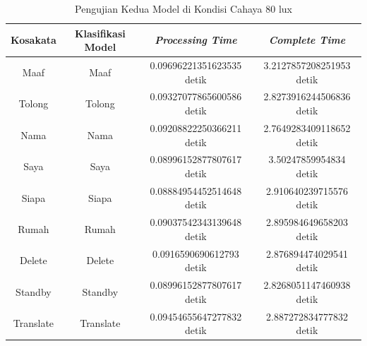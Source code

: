 \newpage
\begin{longtable}{|c|c|c|c|}
  \caption{Pengujian Kedua Model di Kondisi Cahaya 80 lux}
  \label{tb:prediksiremang2}                                   \\
  \hline
  \rowcolor[HTML]{C0C0C0}
  \textbf{Kosakata} & \textbf{Klasifikasi Model} & \textbf{\emph{Processing Time}} & \textbf{\emph{Complete Time}}\\
  \hline
  Maaf              & Maaf                        & 0.09696221351623535 detik                           & 3.2127857208251953 detik                                 \\
  Tolong            & Tolong                      & 0.09327077865600586 detik                           & 2.8273916244506836 detik                                 \\
  Nama              & Nama                        & 0.09208822250366211 detik                           & 2.7649283409118652 detik                                 \\
  Saya              & Saya                        & 0.08996152877807617 detik                           & 3.50247859954834 detik                               \\
  Siapa             & Siapa                       & 0.08884954452514648 detik                           & 2.910640239715576 detik                                \\
  Rumah             & Rumah                       & 0.09037542343139648 detik                           & 2.895984649658203 detik                                \\
  Delete            & Delete                      & 0.0916590690612793 detik                            & 2.876894474029541 detik                                \\
  Standby           & Standby                     & 0.08996152877807617 detik                           & 2.8268051147460938 detik                                 \\
  Translate         & Translate                   & 0.09454655647277832 detik                           & 2.887272834777832 detik                                \\
  \hline
\end{longtable}

